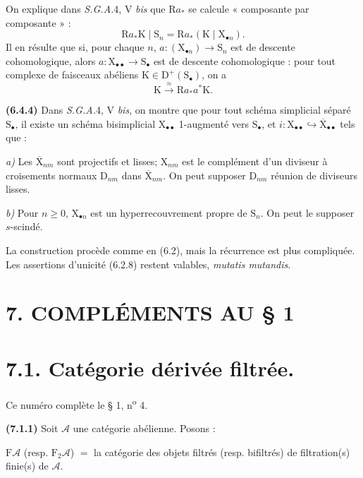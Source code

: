 \documentclass[11pt,leqno]{article}
\begin{document}
On explique dans \textit{S.G.A.}4, V \textit{bis} que \(\mathrm{R}a_{\ast}\) se calcule « composante par composante » :
\[
\mathrm{R}a_{\ast}\mathrm{K}\mid\mathrm{S}_n
=\mathrm{R}a_{\ast}(\mathrm{K}\mid\mathrm{X}_{\bullet n}).
\]
Il en résulte que si, pour chaque \(n\), \(a:(\mathrm{X}_{\bullet n})\to\mathrm{S}_n\) est de descente cohomologique, alors \(a:\mathrm{X}_{\bullet\bullet}\to\mathrm{S}_{\bullet}\) est de descente cohomologique : pour tout complexe de faisceaux abéliens \(\mathrm{K}\in\mathrm{D}^{+}(\mathrm{S}_{\bullet})\), on a
\[
\mathrm{K}\xrightarrow{\approx}\mathrm{R}a_{\ast}a^{\ast}\mathrm{K}.
\]

\textbf{(6.4.4)} Dans \textit{S.G.A.}4, V \textit{bis}, on montre que pour tout schéma simplicial séparé \(\mathrm{S}_{\bullet}\), il existe un schéma bisimplicial \(\mathrm{X}_{\bullet\bullet}\) 1-augmenté vers \(\mathrm{S}_{\bullet}\), et \(i:\mathrm{X}_{\bullet\bullet}\hookrightarrow\overline{\mathrm{X}}_{\bullet\bullet}\) tels que :

\textit{a)} Les \(\overline{\mathrm{X}}_{nm}\) sont projectifs et lisses; \(\mathrm{X}_{nm}\) est le complément d’un diviseur à croisements normaux \(\mathrm{D}_{nm}\) dans \(\overline{\mathrm{X}}_{nm}\). On peut supposer \(\mathrm{D}_{nm}\) réunion de diviseurs lisses.

\textit{b)} Pour \(n\geq 0\), \(\mathrm{X}_{\bullet n}\) est un hyperrecouvrement propre de \(\mathrm{S}_n\). On peut le supposer \(s\)-scindé.

La construction procède comme en (6.2), mais la récurrence est plus compliquée. Les assertions d’unicité (6.2.8) restent valables, \textit{mutatis mutandis}.

\section*{7. COMPLÉMENTS AU § 1}

\section*{7.1. Catégorie dérivée filtrée.}

Ce numéro complète le § 1, n\textsuperscript{o} 4.

\textbf{(7.1.1)} Soit \(\mathscr{A}\) une catégorie abélienne. Posons :

\noindent
\(\mathrm{F}\mathscr{A}\) (resp. \(\mathrm{F}_2\mathscr{A}\)) \(=\) la catégorie des objets filtrés (resp. bifiltrés) de filtration(s) finie(s) de \(\mathscr{A}\).
\end{document}
